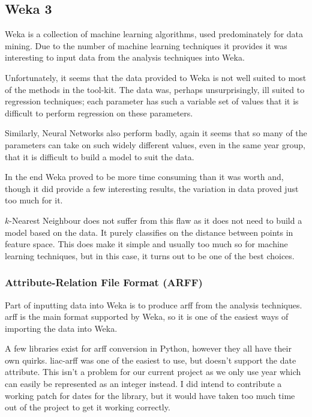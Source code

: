 \subsection{Weka 3}
Weka is a collection of machine learning algorithms\cite{Hall2009WEKA}, used predominately for
data mining. Due to the number of machine learning techniques it provides it was interesting to
input data from the analysis techniques into Weka.

Unfortunately, it seems that the data provided to Weka is not well suited to most of the methods 
in the tool-kit. The data was, perhaps unsurprisingly, ill suited to regression techniques; each
parameter has such a variable set of values that it is difficult to perform regression on these
parameters.

Similarly, Neural Networks also perform badly, again it seems that so many of the parameters can
take on such widely different values, even in the same year group, that it is difficult to build
a model to suit the data.

In the end Weka proved to be more time consuming than it was worth and, though it did provide a 
few interesting results, the variation in data proved just too much for it.

$k$-Nearest Neighbour does not suffer from this flaw as it does not need to build a model based on
the data. It purely classifies on the distance between points in feature space. This does make it
simple and usually too much so for machine learning techniques, but in this case, it turns out to 
be one of the best choices.


\subsubsection{Attribute-Relation File Format (ARFF)}
Part of inputting data into Weka is to produce \gls{arff} from the
analysis techniques. \gls{arff} is the main format supported by Weka, so it is one of the easiest ways
of importing the data into Weka.

A few libraries exist for \gls{arff} conversion in Python, however they all have their own quirks. 
liac-arff was one of the easiest to use, but doesn't support the date attribute. This isn't
a problem for our current project as we only use year which can easily be represented as an 
integer instead. I did intend to contribute a working patch for dates for the library, but it 
would have taken too much time out of the project to get it working correctly.

